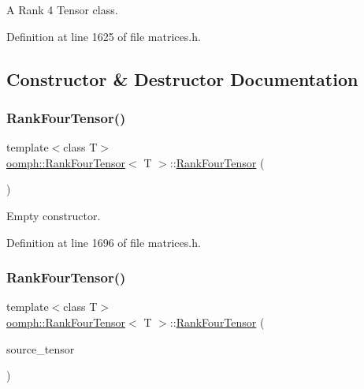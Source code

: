 A Rank 4 Tensor class. 

Definition at line 1625 of file matrices.\+h.



\subsection{Constructor \& Destructor Documentation}
\mbox{\label{classoomph_1_1RankFourTensor_a1fc311bc9c6ae0d7e2845b743b963e80}} 
\subsubsection{\texorpdfstring{Rank\+Four\+Tensor()}{RankFourTensor()}\hspace{0.1cm}{\footnotesize\ttfamily [1/5]}}
{\footnotesize\ttfamily template$<$class T$>$ \\
\hyperlink{classoomph_1_1RankFourTensor}{oomph\+::\+Rank\+Four\+Tensor}$<$ T $>$\+::\hyperlink{classoomph_1_1RankFourTensor}{Rank\+Four\+Tensor} (\begin{DoxyParamCaption}{ }\end{DoxyParamCaption})\hspace{0.3cm}{\ttfamily [inline]}}



Empty constructor. 



Definition at line 1696 of file matrices.\+h.

\mbox{\label{classoomph_1_1RankFourTensor_ae1d00ed47ac1c4ce7dd1b8360affeecc}} 
\subsubsection{\texorpdfstring{Rank\+Four\+Tensor()}{RankFourTensor()}\hspace{0.1cm}{\footnotesize\ttfamily [2/5]}}
{\footnotesize\ttfamily template$<$class T$>$ \\
\hyperlink{classoomph_1_1RankFourTensor}{oomph\+::\+Rank\+Four\+Tensor}$<$ T $>$\+::\hyperlink{classoomph_1_1RankFourTensor}{Rank\+Four\+Tensor} (\begin{DoxyParamCaption}\item[{const \hyperlink{classoomph_1_1RankFourTensor}{Rank\+Four\+Tensor}$<$ T $>$ \&}]{source\+\_\+tensor }\end{DoxyParamCaption})\hspace{0.3cm}{\ttfamily [inline]}}



